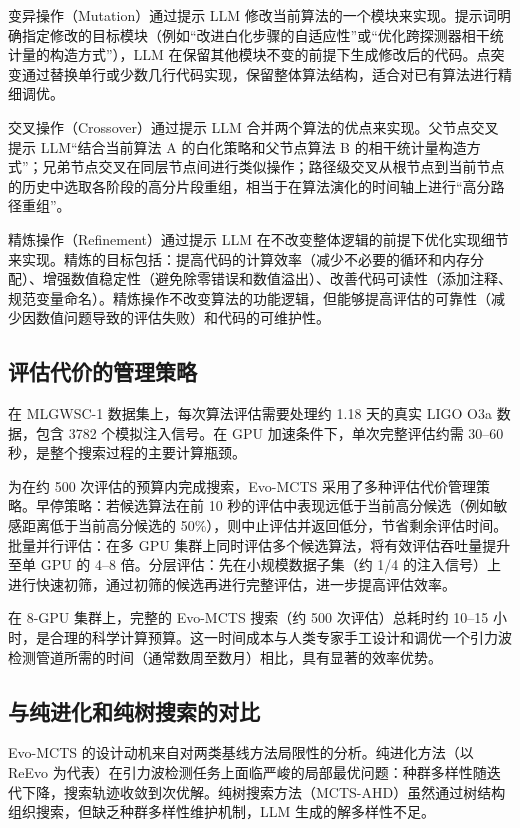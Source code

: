 变异操作（Mutation）通过提示 LLM 修改当前算法的一个模块来实现。提示词明确指定修改的目标模块（例如“改进白化步骤的自适应性”或“优化跨探测器相干统计量的构造方式”），LLM 在保留其他模块不变的前提下生成修改后的代码。点突变通过替换单行或少数几行代码实现，保留整体算法结构，适合对已有算法进行精细调优。

交叉操作（Crossover）通过提示 LLM 合并两个算法的优点来实现。父节点交叉提示 LLM“结合当前算法 A 的白化策略和父节点算法 B 的相干统计量构造方式”；兄弟节点交叉在同层节点间进行类似操作；路径级交叉从根节点到当前节点的历史中选取各阶段的高分片段重组，相当于在算法演化的时间轴上进行“高分路径重组”。

精炼操作（Refinement）通过提示 LLM 在不改变整体逻辑的前提下优化实现细节来实现。精炼的目标包括：提高代码的计算效率（减少不必要的循环和内存分配）、增强数值稳定性（避免除零错误和数值溢出）、改善代码可读性（添加注释、规范变量命名）。精炼操作不改变算法的功能逻辑，但能够提高评估的可靠性（减少因数值问题导致的评估失败）和代码的可维护性。

\subsection{评估代价的管理策略}

在 MLGWSC-1 数据集上，每次算法评估需要处理约 1.18 天的真实 LIGO O3a 数据，包含 3782 个模拟注入信号。在 GPU 加速条件下，单次完整评估约需 30--60 秒，是整个搜索过程的主要计算瓶颈。

为在约 500 次评估的预算内完成搜索，Evo-MCTS 采用了多种评估代价管理策略。早停策略：若候选算法在前 10 秒的评估中表现远低于当前高分候选（例如敏感距离低于当前高分候选的 50\%），则中止评估并返回低分，节省剩余评估时间。批量并行评估：在多 GPU 集群上同时评估多个候选算法，将有效评估吞吐量提升至单 GPU 的 4--8 倍。分层评估：先在小规模数据子集（约 1/4 的注入信号）上进行快速初筛，通过初筛的候选再进行完整评估，进一步提高评估效率。

在 8-GPU 集群上，完整的 Evo-MCTS 搜索（约 500 次评估）总耗时约 10--15 小时，是合理的科学计算预算。这一时间成本与人类专家手工设计和调优一个引力波检测管道所需的时间（通常数周至数月）相比，具有显著的效率优势。

\subsection{与纯进化和纯树搜索的对比}

Evo-MCTS 的设计动机来自对两类基线方法局限性的分析。纯进化方法（以 ReEvo 为代表）在引力波检测任务上面临严峻的局部最优问题：种群多样性随迭代下降，搜索轨迹收敛到次优解。纯树搜索方法（MCTS-AHD）虽然通过树结构组织搜索，但缺乏种群多样性维护机制，LLM 生成的解多样性不足。

